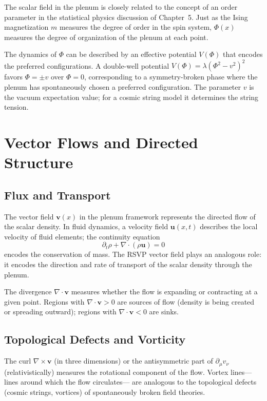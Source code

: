 \documentclass[12pt,a4paper,oneside]{book}
\theoremstyle{definition}
\theoremstyle{plain}
\theoremstyle{remark}
\begin{document}
The scalar field in the plenum is closely related to the concept of an order
parameter in the statistical physics discussion of Chapter~5. Just as the
Ising magnetization $m$ measures the degree of order in the spin system,
$\Phi(x)$ measures the degree of organization of the plenum at each point.

The dynamics of $\Phi$ can be described by an effective potential $V(\Phi)$
that encodes the preferred configurations. A double-well potential
$V(\Phi) = \lambda(\Phi^2 - v^2)^2$ favors $\Phi = \pm v$ over $\Phi = 0$,
corresponding to a symmetry-broken phase where the plenum has spontaneously
chosen a preferred configuration. The parameter $v$ is the vacuum expectation
value; for a cosmic string model it determines the string tension.

\chapter{Vector Flows and Directed Structure}

\section{Flux and Transport}

The vector field $\mathbf{v}(x)$ in the plenum framework represents the
directed flow of the scalar density. In fluid dynamics, a velocity field
$\mathbf{u}(x,t)$ describes the local velocity of fluid elements; the
continuity equation
\begin{equation}
\partial_t\rho + \nabla\cdot(\rho\mathbf{u}) = 0
\end{equation}
encodes the conservation of mass. The RSVP vector field plays an analogous
role: it encodes the direction and rate of transport of the scalar density
through the plenum.

The divergence $\nabla\cdot\mathbf{v}$ measures whether the flow is expanding
or contracting at a given point. Regions with $\nabla\cdot\mathbf{v} > 0$ are
sources of flow (density is being created or spreading outward); regions with
$\nabla\cdot\mathbf{v} < 0$ are sinks.

\section{Topological Defects and Vorticity}

The curl $\nabla\times\mathbf{v}$ (in three dimensions) or the antisymmetric
part of $\partial_\mu v_\nu$ (relativistically) measures the rotational
component of the flow. Vortex lines---lines around which the flow circulates---
are analogous to the topological defects (cosmic strings, vortices) of
spontaneously broken field theories.
\end{document}

